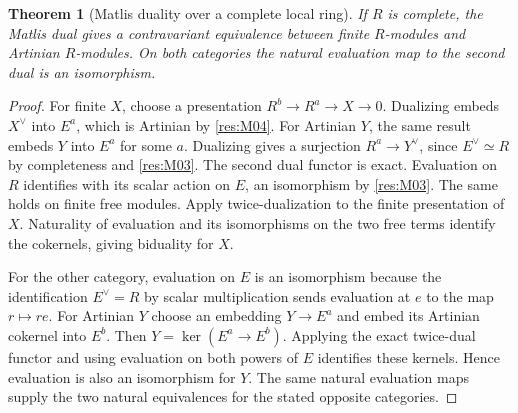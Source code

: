\documentclass[11pt,oneside,openany]{book}
\newtheorem{theorem}{Theorem}[chapter]
\theoremstyle{definition}
\theoremstyle{remark}
\begin{document}
\begin{theorem}[Matlis duality over a complete local ring]\label{res:M05}
If $R$ is complete, the Matlis dual gives a contravariant equivalence
between finite $R$-modules and Artinian $R$-modules. On both categories
the natural evaluation map to the second dual is an isomorphism.
\end{theorem}
\begin{proof}
For finite $X$, choose a presentation $R^b\to R^a\to X\to0$.
Dualizing embeds $X^\vee$ into $E^a$, which is Artinian by
\ref{res:M04}. For Artinian $Y$, the same result embeds $Y$ into $E^a$
for some $a$. Dualizing gives a surjection $R^a\to Y^\vee$, since
$E^\vee\simeq R$ by completeness and \ref{res:M03}. The second dual
functor is exact. Evaluation on $R$ identifies with its scalar action
on $E$, an isomorphism by \ref{res:M03}. The same holds on finite free
modules. Apply twice-dualization to the finite presentation of $X$.
Naturality of evaluation and its isomorphisms on the two free terms
identify the cokernels, giving biduality for $X$.

For the other category, evaluation on $E$ is an isomorphism because the
identification $E^\vee=R$ by scalar multiplication sends evaluation
at $e$ to the map $r\mapsto re$. For Artinian $Y$ choose an embedding
$Y\to E^a$ and embed its Artinian cokernel into $E^b$. Then
$Y=\ker(E^a\to E^b)$. Applying the exact twice-dual functor and using
evaluation on both powers of $E$ identifies these kernels. Hence
evaluation is also an isomorphism for $Y$. The same natural evaluation
maps supply the two natural equivalences for the stated opposite
categories.
\end{proof}
\end{document}
